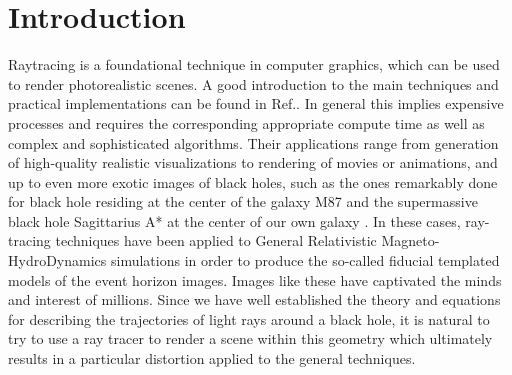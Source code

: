 

\section{Introduction}
\label{sec:intro}



Raytracing is a foundational technique in computer graphics, which can be used
to render photorealistic scenes.
A good introduction to the main techniques and practical implementations can be found
in Ref.\cite{raytracing_in_one_weekend}.
In general this implies expensive processes and requires the corresponding appropriate compute time
as well as complex and sophisticated algorithms.
Their applications range from generation of high-quality realistic visualizations to
rendering of movies or animations, and up to even more exotic images of black holes,
such as the ones remarkably done for black hole residing at the center of the galaxy M87 \cite{M87_EHT_i}
and the supermassive black hole Sagittarius A* at the center of our own galaxy \cite{SagA_EHT_i}.
In these cases, ray-tracing techniques have been applied to
General Relativistic Magneto-HydroDynamics simulations in order to produce 
the so-called fiducial templated models of the event horizon images.
Images like these have captivated the minds and interest of millions.
Since we have well established the theory and equations for describing the trajectories of light rays around a black hole, it is natural to try to use a ray tracer to render a scene within this geometry which ultimately results in a particular distortion applied to the general techniques.

